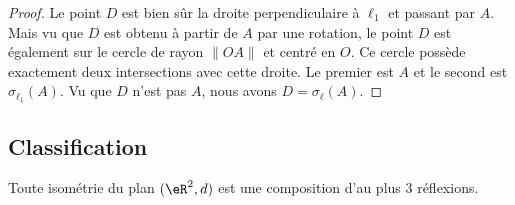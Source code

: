 \begin{proof}
    Le point \( D\) est bien sûr la droite perpendiculaire à \( \ell_1\) et passant par \( A\). Mais vu que \( D\) est obtenu à partir de \( A\) par une rotation, le point \( D\) est également sur le cercle de rayon \( \| OA \|\) et centré en \( O\). Ce cercle possède exactement deux intersections avec cette droite. Le premier est \( A\) et le second est \( \sigma_{\ell_1}(A)\). Vu que \( D\) n'est pas \( A\), nous avons \( D=\sigma_{\ell}(A)\).
\end{proof}

\subsection{Classification}

\begin{theorem}      \label{THOooRORQooTDWFdv}
    Toute isométrie du plan \( (\eR^2,d)\) est une composition d'au plus \( 3\) réflexions.
\end{theorem}

